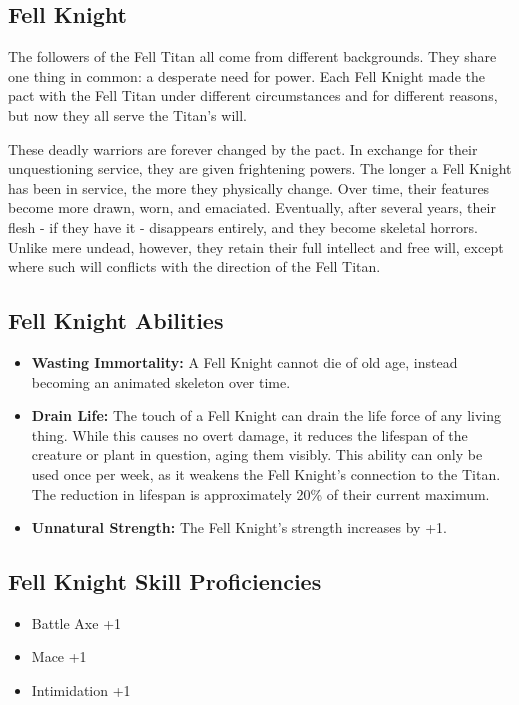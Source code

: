 \begin{multicols}{2}
\section{Fell Knight}

The followers of the Fell Titan all come from different backgrounds. 
They share one thing in common: a desperate need for power. Each Fell 
Knight made the pact with the Fell Titan under different circumstances 
and for different reasons, but now they all serve the Titan's will.

These deadly warriors are forever changed by the pact. In exchange for 
their unquestioning service, they are given frightening powers. The longer 
a Fell Knight has been in service, the more they physically change. Over 
time, their features become more drawn, worn, and emaciated. Eventually, 
after several years, their flesh - if they have it - disappears entirely, 
and they become skeletal horrors. Unlike mere undead, however, they retain 
their full intellect and free will, except where such will conflicts with 
the direction of the Fell Titan.

\subsection{Fell Knight Abilities}

\begin{itemize}
    \item \textbf{Wasting Immortality:} A Fell Knight cannot die of old age, 
    instead becoming an animated skeleton over time.
    \item \textbf{Drain Life:} The touch of a Fell Knight can drain the life 
    force of any living thing. While this causes no overt damage, it reduces 
    the lifespan of the creature or plant in question, aging them visibly. 
    This ability can only be used once per week, as it weakens the Fell 
    Knight's connection to the Titan. The reduction in lifespan is
    approximately 20\% of their current maximum.
    \item \textbf{Unnatural Strength:} The Fell Knight's strength increases by +1.
\end{itemize}

\subsection{Fell Knight Skill Proficiencies}

\begin{itemize}
    \item Battle Axe +1
    \item Mace +1
    \item Intimidation +1
\end{itemize}


\end{multicols}
